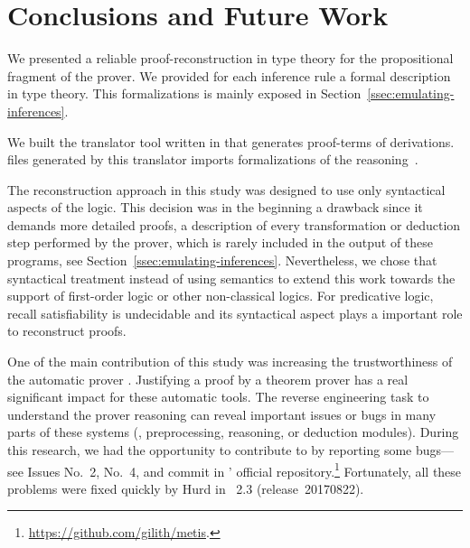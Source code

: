 \documentclass[../main.tex]{subfiles}
\begin{document}

\section{Conclusions and Future Work}
\label{sec:conclusions}

We presented a reliable proof-reconstruction in type theory
for the propositional fragment of the \Metis prover. We provided for
each \Metis inference rule a formal description in type theory.
This formalizations is mainly exposed in
Section~\ref{ssec:emulating-inferences}.

We built the \Athena translator tool written in \Haskell
that generates \Agda proof-terms of \Metis derivations.
\Agda files generated by this translator imports
\Agda formalizations of the \Metis reasoning~\cite{AgdaProp,AgdaMetis}.

The reconstruction approach in this study was designed to use
only syntactical aspects of the logic.
This decision was in the beginning a drawback
since it demands more detailed proofs, a
description of every transformation or deduction step performed by
the prover, which is rarely included in the output of these programs,
see Section~\ref{ssec:emulating-inferences}.
Nevertheless, we chose that syntactical treatment instead of using
semantics to extend this work towards the support of first-order logic
or other non-classical logics.
For predicative logic, recall satisfiability is undecidable and
its syntactical aspect plays a important role to reconstruct proofs.

One of the main contribution of this study was increasing the
trustworthiness of the automatic prover \Metis. Justifying a proof by
a theorem prover has a real significant impact for these automatic
tools.  The reverse engineering task to understand the prover
reasoning can reveal important issues or bugs in many parts of these
systems (\eg, preprocessing, reasoning, or deduction modules). During
this research, we had the opportunity to contribute to \Metis by
reporting some bugs---see Issues No.~2, No.~4, and commit
 in \Metis' official
repository.\footnote{\url{https://github.com/gilith/metis}.}
Fortunately, all these problems were fixed quickly by Hurd in
\Metis~2.3 (release~20170822).
\end{document}
